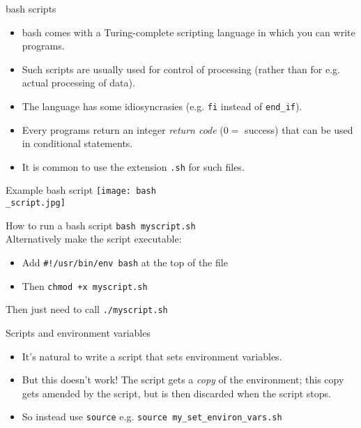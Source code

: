 \documentclass[dvipsnames]{beamer}
\newcommand{\command}[1]{\colorbox{light-gray}{\texttt{#1}}}
\newcommand{\filename}[1]{\colorbox{light-green}{\texttt{#1}}}
\begin{document}
\begin{frame}{bash scripts}
  \begin{itemize}
  \item bash comes with a Turing-complete scripting language in which you can write programs.
  \item Such scripts are usually used for control of processing (rather than for e.g. actual processing of data).
  \item The language has some idiosyncrasies (e.g. \command{fi} instead of \command{end\_if}).
  \item Every programs return an integer \textit{return code} ($0 = $ success) that can be used in conditional statements.
  \item It is common to use the extension \filename{.sh} for such files.
  \end{itemize}
\end{frame}


\begin{frame}{Example bash script}
  \texttt{[image: bash\\\_script.jpg]}
\end{frame}


\begin{frame}{How to run a bash script}
    \command{bash myscript.sh} \\
  \vspace{1cm}
  Alternatively make the script executable:
  \begin{itemize}
  \item Add \command{\#!/usr/bin/env bash} at the top of the file
   \item Then \command{chmod +x myscript.sh}
     \end{itemize}
     Then just need to call \command{./myscript.sh}
\end{frame}


\begin{frame}{Scripts and environment variables}
\begin{itemize}
\item It's natural to write a script that sets environment variables.
\item But this doesn't work! The script gets a \textit{copy} of the environment; this copy gets amended by the script, but is then discarded when the script stops.
\item So instead use \command{source} e.g. \command{source my\_set\_environ\_vars.sh}
\end{itemize}
\end{frame}
\end{document}

